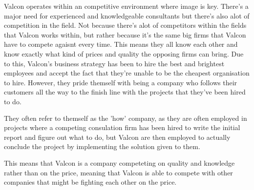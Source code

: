 Valcon operates within an competitive environment where image is key. 
There's a major need for experienced and knowledgeable consultants but there's also alot of competition in the field.
Not because there's alot of competitors within the fields that Valcon works within, but rather because it's the same big firms that Valcon have to compete agaisnt every time. 
This means they all know each other and know exactly what kind of prices and quality the opposing firms can bring.
Due to this, Valcon's business strategy has been to hire the best and brightest employees and accept the fact that they're unable to be the cheapest organisation to hire. 
However, they pride themself with being a company who follows their customers all the way to the finish line with the projects that they've been hired to do.

They often refer to themself as the 'how' company, as they are often employed in projects where a competing consulation firm has been hired to write the initial report and figure out what to do, but Valcon are then employed to actually conclude the project by implementing the solution given to them.

This means that Valcon is a company competeting on quality and knowledge rather than on the price, meaning that Valcon is able to compete with other companies that might be fighting each other on the price. 